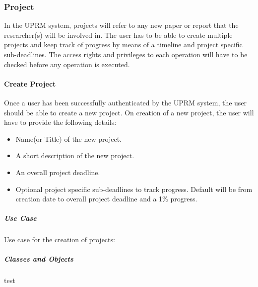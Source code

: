 \subsubsection{Project}
	In the UPRM system, projects will refer to any new paper or report that the researcher(s) will be involved in. The user has to be able to create multiple projects and keep track of progress by means of a timeline and project specific sub-deadlines.
	The access rights and privileges to each operation will have to be checked before any operation is executed.\\
	
	\centerline{}
	
	\setcounter{secnumdepth}{4}
	\paragraph{Create Project\\}
	Once a user has been successfully authenticated by the UPRM system, the user should be able to create a new project. On creation of a new project, the user will have to provide the following details:
	\begin{itemize}
		\item Name(or Title) of the new project.
		\item A short description of the new project.
		\item An overall project deadline.
		\item Optional project specific sub-deadlines to track progress. Default will be from creation date to overall project deadline and a 1\% progress.
	\end{itemize} 
	
	\setcounter{secnumdepth}{5}
	\subparagraph{Use Case\\}
		Use case for the creation of projects:\\
		\centerline{}
	
	\subparagraph{Classes and Objects\\}
	test
	